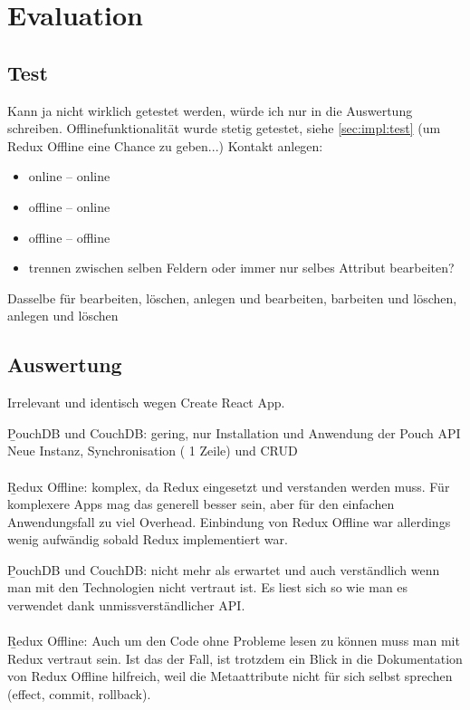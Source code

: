 \chapter{\label{chap:evaluation}Evaluation}
\section{Test}
Kann ja nicht wirklich getestet werden, würde ich nur in die Auswertung schreiben.
Offlinefunktionalität wurde stetig getestet, siehe \ref{sec:impl:test}
(um Redux Offline eine Chance zu geben...)
Kontakt anlegen:
\begin{itemize}
	\item online -- online
	\item offline -- online
	\item offline -- offline
	\item trennen zwischen selben Feldern oder immer nur selbes Attribut bearbeiten?
\end{itemize}
Dasselbe für bearbeiten, löschen,
anlegen und bearbeiten, barbeiten und löschen, anlegen und löschen\\

%
%
\section{Auswertung}
\begin{description}[leftmargin=0.7cm,style=nextline]
\item[Setup der App:] 
Irrelevant und identisch wegen Create React App.\\
\item[Einbinding der Technologien:] 
\b{PouchDB und CouchDB:} gering, nur Installation und Anwendung der Pouch API\\
Neue Instanz, Synchronisation ( 1 Zeile) und CRUD\\\\
\b{Redux Offline:} komplex, da Redux eingesetzt und verstanden werden muss. Für komplexere Apps mag das generell besser sein, aber für den einfachen Anwendungsfall zu viel Overhead. Einbindung von Redux Offline war allerdings wenig aufwändig sobald Redux implementiert war.\\
\item[Lesbarkeit des Codes:] 
\b{PouchDB und CouchDB:} nicht mehr als erwartet und auch verständlich wenn man mit den Technologien nicht vertraut ist. Es liest sich so wie man es verwendet dank unmissverständlicher API.\\\\
\b{Redux Offline:} Auch um den Code ohne Probleme lesen zu können muss man mit Redux vertraut sein. Ist das der Fall, ist trotzdem ein Blick in die Dokumentation von Redux Offline hilfreich, weil die Metaattribute nicht für sich selbst sprechen (effect, commit, rollback).\\
\end{description}
%
%

